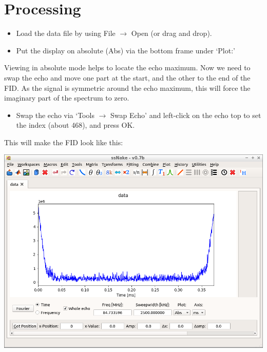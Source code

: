 \documentclass[11pt,a4paper]{article}
\begin{document}
\section{Processing}
\begin{itemize}
\item Load the data file by using File $\longrightarrow$ Open (or drag and drop).
\item Put the display on absolute (Abs) via the bottom frame under `Plot:'
\end{itemize}
Viewing in absolute mode helps to locate the echo maximum.
Now we need to swap the echo and move one part at the start, and the other to the end of the FID.
As the signal is symmetric around the echo maximum, this will force the imaginary part of the spectrum to zero.
\begin{itemize}
\item Swap the echo via `Tools $\longrightarrow$ Swap Echo' and left-click on the echo top to set the index (about 468), and press OK. 
\end{itemize}
This will make the FID look like this:
\begin{center}
\includegraphics[width=0.8\linewidth]{Figs/Fig1.png}
\end{center}
\end{document}
